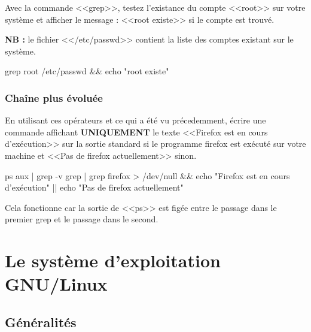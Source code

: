 \documentclass[11pt]{article}
\begin{document}
Avec la commande <<grep>>, testez l'existance du compte <<root>> sur votre système et afficher le message : <<root existe>> si le compte est trouvé.

\textbf{NB :} le fichier <</etc/passwd>> contient la liste des comptes existant sur le système.

\begin{solution}
grep root /etc/passwd \&\& echo "root existe"
\end{solution}

\subsubsection{Chaîne plus évoluée}

En utilisant ces opérateurs et ce qui a été vu précedemment, écrire une commande affichant \textbf{UNIQUEMENT} le texte <<Firefox est en cours d'exécution>> sur la sortie standard si le programme firefox est exécuté sur votre machine et <<Pas de firefox actuellement>> sinon.

\begin{solution}
ps aux | grep -v grep | grep firefox > /dev/null \&\& echo "Firefox est en cours d'exécution" || echo "Pas de firefox actuellement"

Cela fonctionne car la sortie de <<ps>> est figée entre le passage dans le premier grep et le passage dans le second.

\end{solution}

\section{Le système d'exploitation GNU/Linux}

\subsection{Généralités}
\end{document}

